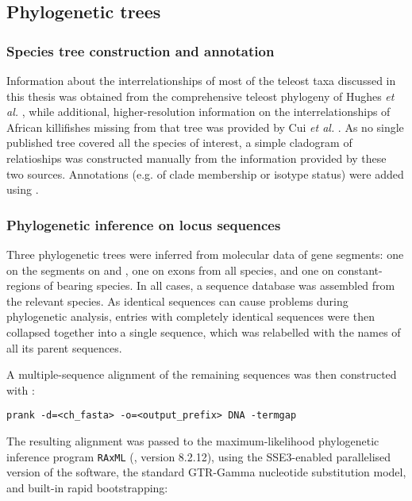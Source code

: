 {\subsection{Phylogenetic trees}
\label{sec:methods_comp_trees}


\subsubsection{Species tree construction and annotation}
\label{sec:methods_comp_trees_species}

Information about the interrelationships of most of the teleost taxa discussed in this thesis was obtained from the comprehensive teleost phylogeny of Hughes \textit{et al.} \parencite{hughes2018teleostphylo}, while additional, higher-resolution information on the interrelationships of African killifishes missing from that tree was provided by Cui \textit{et al.} \parencite{cui2018annual}. %
As no single published tree covered all the species of interest, a simple cladogram of relatioships was constructed manually from the information provided by these two sources. Annotations (e.g. of clade membership or isotype status) were added using  \parencite{guangchuang2018tidytree}.

\subsubsection{Phylogenetic inference on \igh{} locus sequences}
\label{sec:methods_comp_trees_phylo}

Three phylogenetic trees were inferred from molecular data of  gene segments: one on the \vh segments on \nfu and \xma, one on \ch exons from all species, and one on  constant-regions of  bearing species. In all cases, a sequence  database was assembled from the relevant species. As identical sequences can cause problems during phylogenetic analysis, entries with completely identical sequences  were then collapsed together into a single  sequence, which was relabelled with the names of all its parent sequences. 

A multiple-sequence alignment of the remaining sequences was then constructed with :

\begin{lstlisting}
prank -d=<ch_fasta> -o=<output_prefix> DNA -termgap
\end{lstlisting}

The resulting alignment was passed to the maximum-likelihood phylogenetic inference program \lstinline{RAxML} (\parencite{stamatakis2005raxml3,stamatakis2006raxml6,stamatakis2014raxml8}, version 8.2.12), using the SSE3-enabled parallelised version of the software, the standard GTR-Gamma nucleotide substitution model, and built-in rapid bootstrapping:

}
